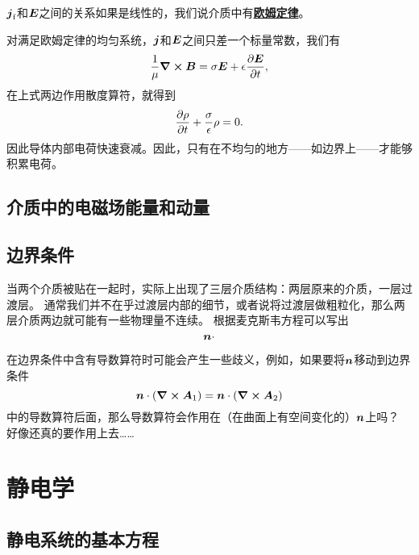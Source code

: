 \documentclass[UTF8, a4paper]{ctexart}
\newcommand*{\concept}[1]{\underline{\textbf{#1}}}
\begin{document}
$\vb*{j}_\text{f}$和$\vb*{E}$之间的关系如果是线性的，我们说介质中有\concept{欧姆定律}。

对满足欧姆定律的均匀系统，$\vb*{j}$和$\vb*{E}$之间只差一个标量常数，我们有
\[
    \frac{1}{\mu} \curl{\vb*{B}} = \sigma \vb*{E} + \epsilon \pdv{\vb*{E}}{t},
\]
在上式两边作用散度算符，就得到
\begin{equation}
    \pdv{\rho}{t} + \frac{\sigma}{\epsilon} \rho = 0.
\end{equation}
因此导体内部电荷快速衰减。因此，只有在不均匀的地方——如边界上——才能够积累电荷。

\subsection{介质中的电磁场能量和动量}

\subsection{边界条件}

当两个介质被贴在一起时，实际上出现了三层介质结构：两层原来的介质，一层过渡层。
通常我们并不在乎过渡层内部的细节，或者说将过渡层做粗粒化，那么两层介质两边就可能有一些物理量不连续。
根据麦克斯韦方程可以写出
\begin{equation}
    \vb*{n} \cdot 
\end{equation}

在边界条件中含有导数算符时可能会产生一些歧义，例如，如果要将$\vb*{n}$移动到边界条件
\[
    \vb*{n} \cdot (\curl{\vb*{A}_1}) = \vb*{n} \cdot (\curl{\vb*{A}_2})
\]
中的导数算符后面，那么导数算符会作用在（在曲面上有空间变化的）$\vb*{n}$上吗？
好像还真的要作用上去……

\section{静电学}

\subsection{静电系统的基本方程}
\end{document}

